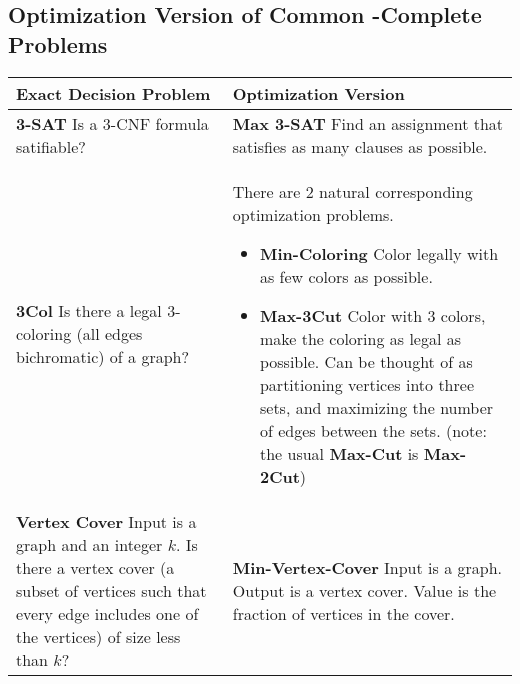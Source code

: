 \subsection{Optimization Version of Common \NP-Complete Problems} \label{sec:optimization_np}
\begin{center}
    \begin{tabular}{p{}p{}}
        \toprule
        Exact Decision Problem & Optimization Version \\
        \midrule
        \textbf{3-SAT} \newline 
        Is a 3-CNF formula satifiable?
            & \textbf{Max 3-SAT} \newline
            Find an assignment that satisfies as many clauses as possible. \\
        \midrule
        \textbf{3Col} \newline
        Is there a legal 3-coloring (all edges bichromatic) of a graph?
            & There are 2 natural corresponding optimization problems.
            \begin{itemize}
                \item \textbf{Min-Coloring} \newline
                    Color legally with as few colors as possible.
                \item \textbf{Max-3Cut} \newline
                    Color with 3 colors, make the coloring as legal as possible.
                    Can be thought of as partitioning vertices into three sets,
                    and maximizing the number of edges between the sets.
                    \newline
                    (note: the usual \textbf{Max-Cut} is \textbf{Max-2Cut}) 
            \end{itemize} \\
        \midrule
        \textbf{Vertex Cover} \newline
        Input is a graph and an integer $k$.
        Is there a vertex cover (a subset of vertices such that every edge
        includes one of the vertices) of size less than $k$?
            & \textbf{Min-Vertex-Cover} \newline
            Input is a graph.
            Output is a vertex cover.
            Value is the fraction of vertices in the cover. \\
        \bottomrule
    \end{tabular}
\end{center}


